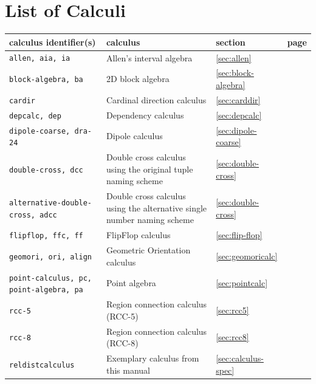 \documentclass[headsepline]{scrreprt}
\theoremstyle{definition}
\begin{document}
\section{List of Calculi}
\renewcommand{\arraystretch}{1.5}
\begin{center}
\begin{longtable}{|p{4cm}p{6cm}ll|}\hline
	{\bf calculus identifier(s)} & {\bf calculus} & {\bf section} & {\bf page}\\ \hline \hline
%
	{\tt allen, aia, ia} & Allen's interval algebra \citep{allen83} & \ref{sec:allen} & \pageref{sec:allen} \\
	{\tt block-algebra, ba} & 2D block algebra \citep{guesgen:89} & \ref{sec:block-algebra} & \pageref{sec:block-algebra}\\
	{\tt cardir} & Cardinal direction calculus \citep{ligozat98_carddir}  & \ref{sec:carddir} & \pageref{sec:carddir} \\
	{\tt depcalc, dep} & Dependency calculus \citep{Ragni05_DepCalc} & \ref{sec:depcalc} & \pageref{sec:depcalc} \\
	{\tt dipole-coarse, dra-24} & Dipole calculus \citep{moratz-renz-wolter-ECAI:00} & \ref{sec:dipole-coarse} & \pageref{sec:dipole-coarse} \\
	{\tt double-cross, dcc} & Double cross calculus \citep{cosyfre92} using the original tuple naming scheme & \ref{sec:double-cross} & \pageref{sec:double-cross} \\
	{\tt alternative-double- cross, adcc} & Double cross calculus \citep{cosyfre92} using the alternative single number naming scheme & \ref{sec:double-cross} & \pageref{sec:double-cross} \\
	{\tt flipflop, ffc, ff} & FlipFlop calculus \citep{Ligozat93_FlipFlopCalculus}& \ref{sec:flip-flop} & \pageref{sec:flip-flop} \\
	{\tt geomori, ori, align} & Geometric Orientation calculus & \ref{sec:geomoricalc} & \pageref{sec:geomoricalc} \\
	{\tt point-calculus, pc, point-algebra, pa} & Point algebra \citep{vilain_kautz_beek_89_constraint} & \ref{sec:pointcalc} & \pageref{sec:pointcalc} \\
	{\tt rcc-5} & Region connection calculus (RCC-5) \citep{randell92_rccb} & \ref{sec:rcc5} & \pageref{sec:rcc5} \\
	{\tt rcc-8} & Region connection calculus (RCC-8) \citep{randell92_rccb} & \ref{sec:rcc8} & \pageref{sec:rcc8} \\
	{\tt reldistcalculus} & Exemplary calculus from this manual & \ref{sec:calculus-spec} & \pageref{sec:calculus-spec}\\

\end{longtable}
\end{center}
\end{document}
